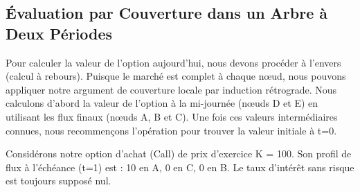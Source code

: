 \subsection{Évaluation par Couverture dans un Arbre à Deux Périodes}

Pour calculer la valeur de l'option aujourd'hui, nous devons procéder à l'envers (calcul à rebours). Puisque le marché est complet à chaque nœud, nous pouvons appliquer notre argument de couverture locale par induction rétrograde. Nous calculons d'abord la valeur de l'option à la mi-journée (nœuds D et E) en utilisant les flux finaux (nœuds A, B et C). Une fois ces valeurs intermédiaires connues, nous recommençons l'opération pour trouver la valeur initiale à t=0.

Considérons notre option d'achat (Call) de prix d'exercice K = 100. Son profil de flux à l'échéance (t=1) est : 10 en A, 0 en C, 0 en B. Le taux d'intérêt sans risque est toujours supposé nul.

